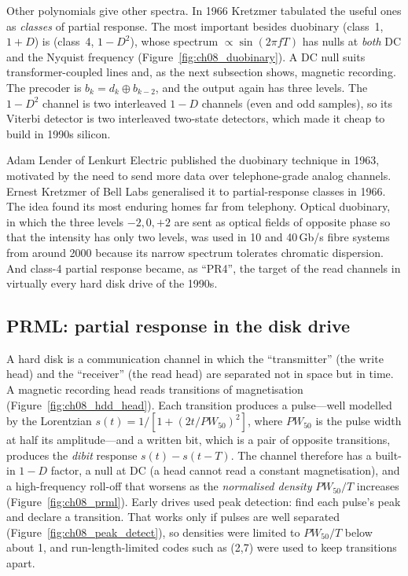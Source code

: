 Other polynomials give other spectra. In 1966 Kretzmer tabulated the useful ones as
\emph{classes} of partial response. The most important besides duobinary (class~1, $1+D$) is
 (class~4, $1-D^2$), whose spectrum
$\propto\sin(2\pi fT)$ has nulls at \emph{both} DC and the Nyquist frequency
(Figure~\ref{fig:ch08_duobinary}). A DC null suits transformer-coupled lines and, as the next
subsection shows, magnetic recording. The precoder is $b_k=d_k\oplus b_{k-2}$, and the output
again has three levels. The $1-D^2$ channel is two interleaved $1-D$ channels (even and odd
samples), so its Viterbi detector is two interleaved two-state detectors, which made it cheap to
build in 1990s silicon.

\begin{history}
Adam Lender of Lenkurt Electric published the duobinary technique in 1963, motivated by the
need to send more data over telephone-grade analog channels. Ernest Kretzmer of Bell Labs
generalised it to partial-response classes in 1966. The idea found its most enduring homes far
from telephony. Optical duobinary, in which the three levels $-2,0,+2$ are sent as optical
fields of opposite phase so that the intensity has only two levels, was used in 10 and 40\,Gb/s
fibre systems from around 2000 because its narrow spectrum tolerates chromatic dispersion. And
class-4 partial response became, as ``PR4'', the target of the read channels in virtually every
hard disk drive of the 1990s.
\end{history}

\subsection{PRML: partial response in the disk drive}


A hard disk is a communication channel in which the ``transmitter'' (the write head) and the
``receiver'' (the read head) are separated not in space but in time. A magnetic recording head
reads transitions of magnetisation (Figure~\ref{fig:ch08_hdd_head}). Each transition produces a
pulse---well modelled by the Lorentzian $s(t)=1/[1+(2t/PW_{50})^2]$, where $PW_{50}$ is the pulse
width at half its amplitude---and a written bit, which is a pair of opposite transitions,
produces the \emph{dibit} response $s(t)-s(t-T)$. The channel therefore has a built-in $1-D$
factor, a null at DC (a head cannot read a constant magnetisation), and a high-frequency
roll-off that worsens as the \emph{normalised density} $PW_{50}/T$ increases
(Figure~\ref{fig:ch08_prml}). Early drives used peak detection: find each pulse's peak and
declare a transition. That works only if pulses are well separated
(Figure~\ref{fig:ch08_peak_detect}), so densities were limited to $PW_{50}/T$ below about 1,
and run-length-limited codes such as (2,7) were used to keep transitions apart.

